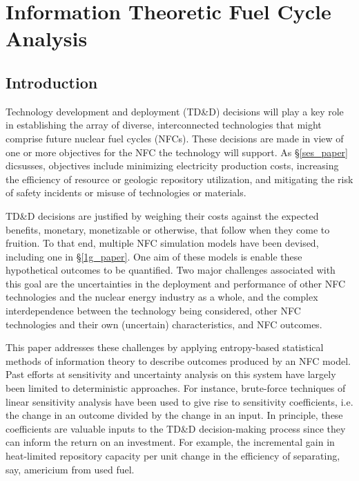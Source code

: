 \chapter{Information Theoretic Fuel Cycle Analysis}
\label{cts_paper}



\section{Introduction}
\label{cts_sec:intro}

Technology development and deployment (TD\&D) decisions will play a key role in
establishing the array of diverse, interconnected technologies that might comprise
future nuclear fuel cycles (NFCs).  These decisions are made in view of one or more
objectives for the NFC the technology will support.  As \S \ref{ses_paper} dicsusses,  
objectives include minimizing
electricity production costs, increasing the efficiency of resource or geologic
repository utilization, and mitigating the risk of safety incidents or misuse of
technologies or materials.

TD\&D decisions are justified by weighing their costs against the expected benefits,
monetary, monetizable or otherwise, that follow when they come to fruition.  To that
end, multiple NFC simulation models  \cite{Jacobson2009, GENIUS1} have been devised, 
including one in \S \ref{1g_paper}.  
One aim of these models is enable these hypothetical outcomes to be quantified.  Two major 
challenges associated with this goal are the uncertainties in the deployment and performance 
of other NFC technologies and the nuclear energy industry as a whole, and the complex 
interdependence between the technology being considered, other NFC technologies and their 
own (uncertain) characteristics, and NFC outcomes.

This paper addresses these challenges by applying entropy-based statistical methods of information
theory to describe outcomes produced by an NFC model.  Past efforts at sensitivity and uncertainty
analysis on this system have largely been limited to deterministic approaches.  For instance,
brute-force techniques of linear sensitivity analysis have been used to give rise to sensitivity
coefficients, i.e. the change in an outcome divided by the change in an input.  In principle, these
coefficients are valuable inputs to the TD\&D decision-making process since they can inform the
return on an investment.  For example, the incremental gain in heat-limited repository capacity per
unit change in the efficiency of separating, say, americium from used fuel.

